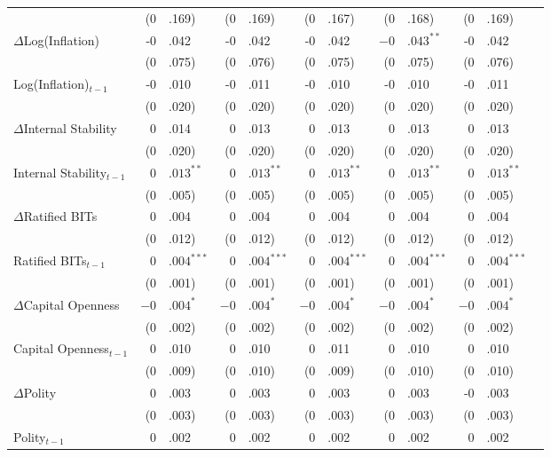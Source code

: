 \documentclass[12pt,onesided]{amsart}
\begin{document}
\begin{table}[ht]
{\begin{tabular}{lr@{} lr@{}lr@{}lr@{}lr@{}lr@{}}
  & (0&.169) & (0&.169) & (0&.167) & (0&.168) & (0&.169) \\
  \multirow{2}{*}{$\Delta$Log(Inflation)} & -0&.042 &  -0&.042 &  -0&.042 &  $-0$&.$043^{\ast\ast}$ &  -0&.042 \\
  & (0&.075) &  (0&.076) &  (0&.075) &  (0&.075) &  (0&.076) \\
  \multirow{2}{*}{Log(Inflation)$_{t-1}$} & -0&.010 &  -0&.011 &  -0&.010 &  -0&.010 &  -0&.011 \\
  & (0&.020) &  (0&.020) &  (0&.020) &  (0&.020) &  (0&.020) \\
  \multirow{2}{*}{$\Delta$Internal Stability} & 0&.014 & 0&.013 &  0&.013 &  0&.013 &  0&.013 \\
  & (0&.020) &  (0&.020) &  (0&.020) &  (0&.020) &  (0&.020) \\
  \multirow{2}{*}{Internal Stability$_{t-1}$} & $0$&$.013^{\ast\ast}$ &  $0$&$.013^{\ast\ast}$ &  $0$&$.013^{\ast\ast}$ &  $0$&$.013^{\ast\ast}$ &  $0$&$.013^{\ast\ast}$ \\
  & (0&.005) &  (0&.005) &  (0&.005) &  (0&.005) &  (0&.005) \\
  \multirow{2}{*}{$\Delta$Ratified BITs} & 0&.004 &  0&.004 &  0&.004 &  0&.004 &  0&.004 \\
  & (0&.012) &  (0&.012) &  (0&.012) &  (0&.012) &  (0&.012) \\
  \multirow{2}{*}{Ratified BITs$_{t-1}$} & $0$&$.004^{\ast\ast\ast}$ & $0$&$.004^{\ast\ast\ast}$ &  $0$&$.004^{\ast\ast\ast}$ &  $0$&$.004^{\ast\ast\ast}$ &  $0$&$.004^{\ast\ast\ast}$ \\
  & (0&.001) & (0&.001) &  (0&.001) &  (0&.001) &  (0&.001) \\
  \multirow{2}{*}{$\Delta$Capital Openness} & $-0$&.$004^{\ast}$ & $-0$&.$004^{\ast}$ &  $-0$&.$004^{\ast}$ &  $-0$&.$004^{\ast}$ &  $-0$&.$004^{\ast}$ \\
  & (0&.002) &     (0&.002) &  (0&.002) &  (0&.002) &  (0&.002) \\
  \multirow{2}{*}{Capital Openness$_{t-1}$} & 0&.010 & 0&.010 &  0&.011 &  0&.010 &  0&.010 \\
  & (0&.009) & (0&.010) & (0&.009) & (0&.010) & (0&.010) \\
  \multirow{2}{*}{$\Delta$Polity} & 0&.003 & 0&.003 &  0&.003 &  0&.003 &  -0&.003 \\
  & (0&.003) & (0&.003) &  (0&.003) &  (0&.003) &  (0&.003) \\
  \multirow{2}{*}{Polity$_{t-1}$} & 0&.002 & 0&.002 &  0&.002 &  0&.002 &  0&.002 \\

\end{tabular}}
\end{table}
\end{document}
